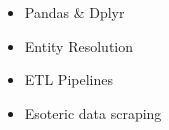 \begin{itemize}
    \item Pandas \& Dplyr
    \item Entity Resolution
    \item ETL Pipelines
    \item Esoteric data scraping
\end{itemize}